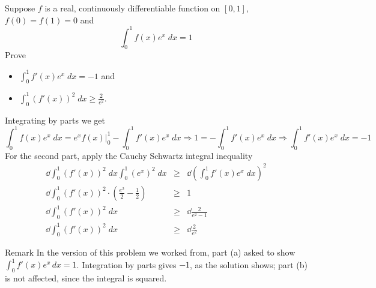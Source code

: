 \begin{problem}
Suppose $f$ is a real, continuously differentiable function on $[0,1]$, $f(0)=f(1)=0$ and \[\int_0^1 f(x) e^x \; dx = 1\]
    Prove 
    \begin{itemize}
        \item [(a)] $\int_0^1 f'(x) e^x \; dx = -1 $ and 
        \item[(b)] $\int_0^1 (f'(x))^2 \; dx \geq \frac{2}{e^2}$.
    \end{itemize}
\begin{solution}
Integrating by parts we get 
    \[\int_0^1 f(x) e^x\; dx = e^x f(x)|_0^1 - \int_0^1 f'(x) e^x \; dx \Rightarrow 1 = - \int_0^1 f'(x) e^x\; dx \Rightarrow \int_0^1 f'(x)e^x\; dx = -1 \]
    For the second part, apply the Cauchy Schwartz integral inequality
    \[\begin{array}{rcl}
    \dd \int_0^1 (f'(x))^2 \; dx\int_0^1 (e^x)^2 \; dx &\geq& \dd \left( \int_0^1 f'(x) e^x\; dx\right)^2 \\ 
    \dd \int_0^1 (f'(x))^2 \cdot \left( \frac{e^2}{2} - \frac{1}{2}\right) &\geq&1 \\ 
    \dd \int_0^1 (f'(x))^2 \; dx  &\geq& \dd \frac{2}{e^2-1} 
    \\ 
    \dd \int_0^1 (f'(x))^2 \; dx  &\geq& \dd \frac{2}{e^2} 
    \end{array}\]
\end{solution}
\end{problem}
\begin{rmkbox}{Remark}
In the version of this problem we worked from, part (a) asked to show $\int_0^1 f'(x) e^x \, dx = 1$. Integration by parts gives $-1$, as the solution shows; part (b) is not affected, since the integral is squared.
\end{rmkbox}

